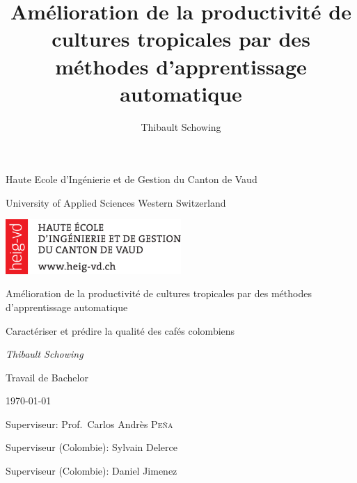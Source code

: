 \documentclass[11pt,a4paper]{report}
\author{Thibault Schowing}
\title{Amélioration de la productivité de cultures tropicales par des méthodes d'apprentissage automatique}
\newcommand\blankpage{%
	\null
	\thispagestyle{empty}%
	\addtocounter{page}{-1}%
	\newpage}
\begin{document}
	
	\begin{titlepage}
		\centering
		
		\small{Haute Ecole d'Ingénierie et de Gestion du Canton de Vaud  \par}
		\footnotesize{University of Applied Sciences Western Switzerland\par}
		\vspace{1cm}
		
		\includegraphics[width=0.5\textwidth]{HEIG-VD_Logo}\par
		
		\vspace{1cm}
		\Large{Amélioration de la productivité de cultures tropicales par des méthodes d'apprentissage automatique\par}
		\vspace{1.5cm}
		\small{Caractériser et prédire la qualité des cafés colombiens \par}
		\vspace{2cm}
		\small\textit{Thibault Schowing}\par
		\small{Travail de Bachelor}\par
		\small{\today\par}
		
		\vfill
		Superviseur: Prof.~Carlos Andrès \textsc{Peña}\par
		Superviseur (Colombie): Sylvain Delerce \par
		Superviseur (Colombie): Daniel Jimenez
		
		
	\end{titlepage}
	
	\afterpage{\blankpage}
	
	
	
	\afterpage{\blankpage}
	
	
	
	\afterpage{\blankpage}
	
	\tableofcontents
	
	\afterpage{\blankpage}
	
	
	
	
	
	
	
	{}
	
	
	
\end{document}
